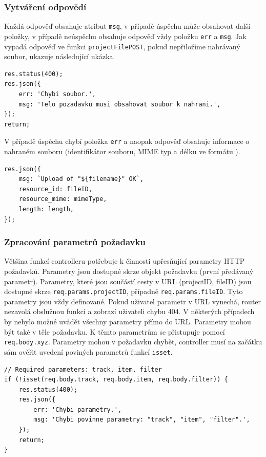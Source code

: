 \subsubsection{Vytváření odpovědí}
Každá odpověď obsahuje atribut \texttt{msg}, v případě úspěchu může obsahovat další položky, v případě neúspěchu obsahuje odpověď vždy položku \texttt{err} a \texttt{msg}. Jak vypadá odpověď ve funkci \texttt{projectFilePOST}, pokud nepřiložíme nahrávaný soubor, ukazuje následující ukázka.
\begin{lstlisting}[style=JavaScript]
res.status(400);
res.json({
    err: 'Chybi soubor.',
    msg: 'Telo pozadavku musi obsahovat soubor k nahrani.',
});
return;
\end{lstlisting}

V případě úspěchu chybí položka \texttt{err} a naopak odpověď obsahuje informace o nahraném souboru (identifikátor souboru, MIME typ a délku ve formátu ).
\begin{lstlisting}[style=JavaScript]
res.json({
    msg: `Upload of "${filename}" OK`,
    resource_id: fileID,
    resource_mime: mimeType,
    length: length,
});
\end{lstlisting}

\subsubsection{Zpracování parametrů požadavku}
Většina funkcí controlleru potřebuje k činnosti upřesňující parametry HTTP požadavků. Parametry jsou dostupné skrze objekt požadavku (první předávaný parametr). Parametry, které jsou součástí cesty v URL (projectID, fileID) jsou dostupné skrze \texttt{req.params.projectID}, případně \texttt{req.params.fileID}. Tyto parametry jsou vždy definované. Pokud uživatel parametr v URL vynechá, router nezavolá obslužnou funkci a zobrazí uživateli chybu 404. V některých případech by nebylo možné uvádět všechny parametry přímo do URL. Parametry mohou být také v těle požadavku. K těmto parametrům se přistupuje pomocí \texttt{req.body.xyz}. Parametry mohou v požadavku chybět, controller musí na začátku sám ověřit uvedení poviných parametrů funkcí \texttt{isset}.
\begin{lstlisting}[style=JavaScript]
// Required parameters: track, item, filter
if (!isset(req.body.track, req.body.item, req.body.filter)) {
    res.status(400);
    res.json({
        err: 'Chybi parametry.',
        msg: 'Chybi povinne parametry: "track", "item", "filter".',
    });
    return;
}
\end{lstlisting}

